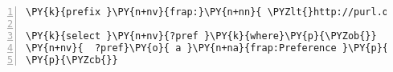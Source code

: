 \expandafter\def\csname PY@tok@err\endcsname{}
{\small
\begin{Verbatim}[commandchars=\\\{\},numbers=left,firstnumber=1,stepnumber=1]
\PY{k}{prefix }\PY{n+nv}{frap:}\PY{n+nn}{ \PYZlt{}http://purl.org/frap/\PYZgt{}}

\PY{k}{select }\PY{n+nv}{?pref }\PY{k}{where}\PY{p}{\PYZob{}}
\PY{n+nv}{	?pref}\PY{o}{ a }\PY{n+na}{frap:Preference }\PY{p}{.}
\PY{p}{\PYZcb{}}
\end{Verbatim}
}